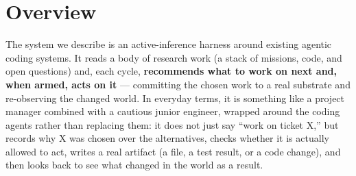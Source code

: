 \section{Overview}\label{sec:overview}

The system we describe is an active-inference harness around existing agentic coding systems.  It reads a body of research work (a stack of missions, code, and open questions) and, each cycle, \textbf{recommends what to work on next and, when armed, acts on it} --- committing the chosen work to a real substrate and re-observing the changed world.  In everyday terms, it is something like a project manager combined with a cautious junior engineer, wrapped around the coding agents rather than replacing them: it does not just say ``work on ticket X,'' but records why X was chosen over the alternatives, checks whether it is actually allowed to act, writes a real artifact (a file, a test result, or a code change), and then looks back to see what changed in the world as a result.
\ifdefined\plopearlyoverview

\fi

